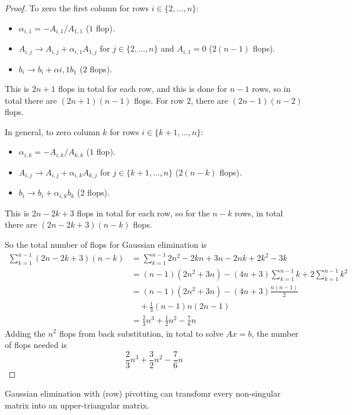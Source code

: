 \begin{proof}
	To zero the first column for rows $i \in \{ 2, \dots, n \}$:
	\begin{itemize}
		\item $\alpha_{i, 1} = -A_{i, 1} / A_{1, 1}$ ($1$ flop).
		\item $A_{i, j} \rightarrow A_{i, j} + \alpha_{i, 1} A_{1, j}$ for $j \in \{ 2, \dots, n \}$ and $A_{i, 1} = 0$ ($2(n - 1)$ flops).
		\item $b_i \rightarrow b_i + \alpha{i, 1} b_1$ ($2$ flops).
	\end{itemize}
	This is $2n + 1$ flops in total for each row, and this is done for $n - 1$ rows, so in total there are $(2n + 1)(n - 1)$ flops. For row $2$, there are $(2n - 1)(n - 2)$ flops.

	In general, to zero column $k$ for rows $i \in \{ k + 1, \dots, n \}$:
	\begin{itemize}
		\item $\alpha_{i, k} = -A_{i, k} / A_{k, k}$ ($1$ flop).
		\item $A_{i, j} \rightarrow A_{i, j} + \alpha_{i, k} A_{k, j}$ for $j \in \{ k + 1, \dots, n \}$ ($2(n - k)$ flops).
		\item $b_i \rightarrow b_i + \alpha_{i, k} b_k$ ($2$ flops).
	\end{itemize}
	This is $2n - 2k + 3$ flops in total for each row, so for the $n - k$ rows, in total there are $(2n - 2k + 3)(n - k)$ flops.

	So the total number of flops for Gaussian elimination is
	\[
		\begin{aligned}
			\sum_{k = 1}^{n - 1} (2n - 2k + 3)(n - k)
				& = \sum_{k = 1}^{n - 1} 2n^2 - 2kn + 3n - 2nk + 2k^2 - 3k \\
				& = (n - 1)(2n^2 + 3n) - (4n + 3) \sum_{k = 1}^{n - 1} k + 2 \sum_{k = 1}^{n - 1} k^2 \\
				& = (n - 1)(2n^2 + 3n) - (4n + 3) \frac{n(n - 1)}{2} \\
				&\quad + \frac{1}{3} (n - 1) n (2n - 1) \\
				& = \frac{2}{3} n^3 + \frac{1}{2} n^2 - \frac{7}{6} n
		\end{aligned}
	\]
	Adding the $n^2$ flops from back substitution, in total to solve $Ax = b$, the number of flops needed is
	\[
		\frac{2}{3} n^3	+ \frac{3}{2} n^2 - \frac{7}{6} n
	\]
\end{proof}

\begin{remark}
	Gaussian elimination with (row) pivotting can transfomr every non-singular matrix into an upper-triangular matrix.
\end{remark}

